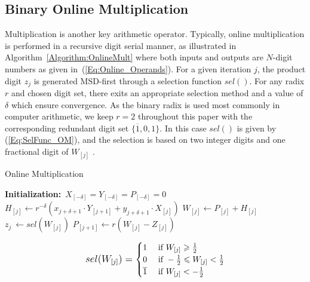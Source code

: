 \documentclass[conference]{IEEEtran}
\begin{document}
\subsection{Binary Online Multiplication}
Multiplication is another key arithmetic operator. Typically, online multiplication is performed in a recursive digit serial manner, as illustrated in Algorithm~\ref{Algorithm:OnlineMult} \cite{Ercegovac_OnlineMult} where both inputs and outputs are $N$-digit numbers as given in~(\ref{Eq:Online_Operands}). For a given iteration $j$, the product digit $z_j$ is generated MSD-first through a selection function $sel()$. For any radix $r$ and chosen digit set, there exits an appropriate selection method and a value of $\delta$ which ensure convergence. As the binary radix is used most commonly in computer arithmetic, we keep $r=2$ throughout this paper with the corresponding redundant digit set $\{\overline{1},0,1\}$. In this case $sel()$ is given by (\ref{Eq:SelFunc_OM}), and the selection is based on two integer digits and one fractional digit of $W_{[j]}$ \cite{Ercegovac_OnlineMult}.

\begin{algorithm}[tbp]
  \caption{Online Multiplication}  \label{Algorithm:OnlineMult}
  \begin{algorithmic}[1]
   \State \textbf{Initialization:}~$X_{[-\delta]}=Y_{[-\delta]}=P_{[-\delta]}=0$\vspace{.5ex}
    \vspace{.5ex}
        \State $H_{[j]} \leftarrow r^{-\delta}\left(x_{j+\delta+1}\cdot Y_{[j+1]}+y_{j+\delta+1}\cdot X_{[j]}\right)$\vspace{.5ex}
        \State $W_{[j]} \leftarrow P_{[j]} + H_{[j]}$\vspace{.5ex}
        \State $z_{j}~ \leftarrow sel(W_{[j]})$\vspace{.5ex}
        \State $P_{[j+1]} \leftarrow r\left(W_{[j]}-Z_{[j]}\right)$\vspace{.5ex}
    \EndFor
  \end{algorithmic}
\end{algorithm}
%
\begin{eqnarray}\label{Eq:SelFunc_OM}
\small
  sel(W_{[j]})=\begin{cases}
    1 & \text{ if } W_{[j]} \geqslant \frac{1}{2} \\
    0 & \text{ if } -\frac{1}{2}\leqslant W_{[j]}<\frac{1}{2} \\
    \overline{1} & \text{ if } W_{[j]}<-\frac{1}{2}
  \end{cases}
\normalsize
\end{eqnarray}
\end{document}
